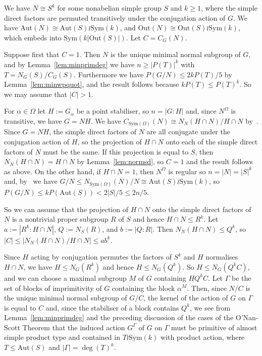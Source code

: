 \documentclass[12pt,a4paper]{article}
\newcommand{\Aut}{\mathrm{Aut}}
\newcommand{\Out}{\mathrm{Out}}
\newcommand{\Sym}{\mathrm{Sym}}
\begin{document}
We have $N \cong S^k$ for some nonabelian simple group $S$ and $k \ge 1$,
where the simple direct factors are permuted transitively under the conjugation
action of $G$.  We have $\Aut(N) \cong \Aut(S) \wr \Sym(k)$, and
$\Out(N) \cong \Out(S) \wr \Sym(k)$, which embeds into $\Sym(k|\Out(S)|)$.
Let $C = C_G(N)$.

Suppose first that $C=1$. Then $N$ is the unique minimal normal subgroup
of $G$, and by Lemma~\ref{lem:minprimdeg} we have $n \ge |P(T)|^k$ with
$T = N_G(S)/C_G(S)$. Furthermore we have $P(G/N) \le 2kP(T)/5$ by
Lemma~\ref{lem:minwpquot}, and the result follows because $kP(T) \le P(T)^k$.
So we may assume that $|C|>1$.

For $\alpha \in \Omega$ let $H:=G_\alpha$ be a point stabiliser,
so $n = |G:H|$ and, since $N^\Omega$ is transitive, we have $G=NH$.
We have $C_{\Sym(\Omega)}(N) \cong N_N(H \cap N)/H \cap N$
by~\cite[Theorem 4.2A\,(i)]{DM}. Since $G=NH$, the simple direct factors of $N$
are all conjugate under the conjugation action of $H$, so
the projection of $H \cap N$ onto each of the simple direct factors of $N$
must be the same. If this projection is equal to $S$, then
$N_N(H \cap N) = H \cap N$ by Lemma~\ref{lem:normsd}, so $C=1$ and
the result follows as above. On the other hand, if $H\cap N=1$, then
$N^\Omega$ is regular so $n=|N|=|S|^k$ and, by~\cite[Theorem 4.2A\,(iii)]{DM}
we have $G/N \le N_{\Sym(\Omega)}(N)/N \cong \Aut(S) \wr \Sym(k)$, so
$P(G/N)\le kP(\Aut(S)) < 2|S|/5 \le 2n/5$.

So we can assume that the projection of $H \cap N$ onto the simple direct
factors of $N$ is a nontrivial proper subgroup $R$ of $S$ and hence
$H \cap N \le R^k$.  Let $a := |R^k:H \cap N|$, $Q := N_S(R)$, and $b:= |Q:R|$.
Then $N_N(H \cap N) \le Q^k$, so $|C| \le |N_N(H \cap N)/H \cap N| \le ab^k$.

Since $H$ acting by conjugation permutes the factors of $S^k$ and $H$
normalises $H \cap N$, we have $H \le N_G(R^k)$ and hence $H \le N_G(Q^k)$.
So $H \le N_G(Q^kC)$, and we can choose a maximal subgroup $M$ of $G$
containing $HQ^kC$. Let $\Gamma$ be the set of blocks of imprimitivity
of $G$ containing the block $\alpha^M$. Then, since $N/C$ is the unique
minimal normal subgroup of $G/C$, the kernel of the action of $G$ on
$\Gamma$ is equal to $C$ and, since the stabiliser of a block contains $Q^k$,
we see from Lemma~\ref{lem:minprimdeg} and the preceding discussion
of the cases of the O'Nan-Scott Theorem that the induced action $G^\Gamma$ of
$G$ on $\Gamma$ must be primitive of almost simple product type and contained
in $T \wr \Sym(k)$ with product action, where $T \le \Aut(S)$ and
$|\Gamma| = \deg(T)^k$.
\end{document}

